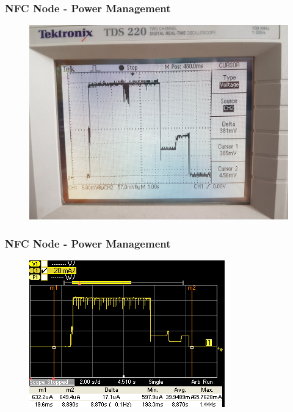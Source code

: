 \begin{frame}[fragile]
\frametitle{NFC Node - Power Management} 
\begin{figure}
  \centering
	\includegraphics[width=\textwidth]{images/NFC12.jpg}
\end{figure}
\end{frame}

\begin{frame}[fragile]
\frametitle{NFC Node - Power Management} 
\begin{figure}
  \centering
	\includegraphics[width=\textwidth]{images/NFC13.jpg}
\end{figure}
\end{frame}


